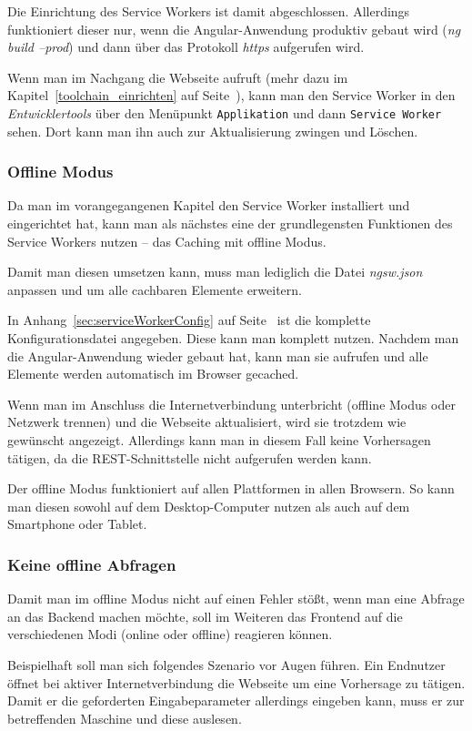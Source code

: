 Die Einrichtung des Service Workers ist damit abgeschlossen. Allerdings funktioniert dieser nur, wenn die
Angular-Anwendung produktiv gebaut wird (\textit{ng build --prod}) und dann über das Protokoll \textit{https} aufgerufen
wird.

Wenn man im Nachgang die Webseite aufruft (mehr dazu im Kapitel~\ref{toolchain_einrichten} auf
Seite~\pageref{toolchain_einrichten}), kann man den Service Worker in den \textit{Entwicklertools} über den Menüpunkt
\texttt{Applikation} und dann \texttt{Service Worker} sehen. Dort kann man ihn auch zur Aktualisierung zwingen und
Löschen.

\subsubsection{Offline Modus}
Da man im vorangegangenen Kapitel den Service Worker installiert und eingerichtet hat, kann man als nächstes eine der
grundlegensten Funktionen des Service Workers nutzen -- das Caching mit offline Modus.

Damit man diesen umsetzen kann, muss man lediglich die Datei \textit{ngsw.json} anpassen und um alle cachbaren Elemente
erweitern.

In Anhang~\ref{sec:serviceWorkerConfig} auf Seite~\pageref{sec:serviceWorkerConfig} ist die komplette
Konfigurationsdatei angegeben. Diese kann man komplett nutzen. Nachdem man die Angular-Anwendung wieder gebaut hat, kann
man sie aufrufen und alle Elemente werden automatisch im Browser gecached.

Wenn man im Anschluss die Internetverbindung unterbricht (offline Modus oder Netzwerk trennen) und die Webseite
aktualisiert, wird sie trotzdem wie gewünscht angezeigt. Allerdings kann man in diesem Fall keine Vorhersagen tätigen,
da die REST-Schnittstelle nicht aufgerufen werden kann.

Der offline Modus funktioniert auf allen Plattformen in allen Browsern. So kann man diesen sowohl auf dem Desktop-Computer
nutzen als auch auf dem Smartphone oder Tablet.

\subsubsection{Keine offline Abfragen}
Damit man im offline Modus nicht auf einen Fehler stößt, wenn man eine Abfrage an das Backend machen möchte, soll im
Weiteren das Frontend auf die verschiedenen Modi (online oder offline) reagieren können.

Beispielhaft soll man sich folgendes Szenario vor Augen führen. Ein Endnutzer öffnet bei aktiver Internetverbindung die
Webseite um eine Vorhersage zu tätigen. Damit er die geforderten Eingabeparameter allerdings eingeben kann, muss er zur
betreffenden Maschine und diese auslesen.

